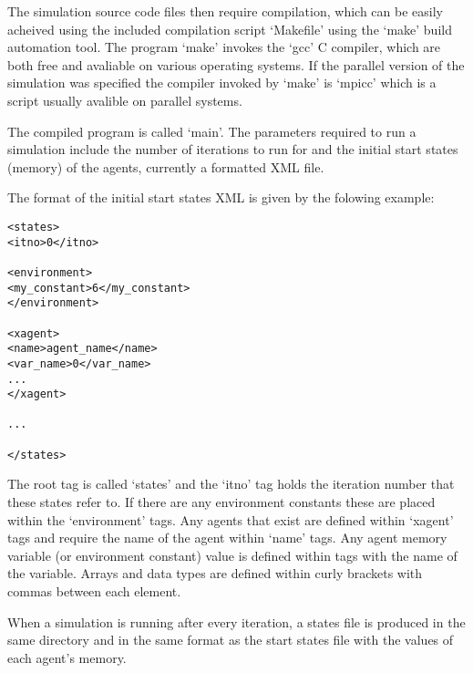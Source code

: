 The simulation source code files then require compilation, which can be easily
acheived using the included compilation script `Makefile' using the `make'
build automation tool. The program `make' invokes the `gcc' C compiler, which
are both free and avaliable on various operating systems. If the parallel
version of the simulation was specified the compiler invoked by `make' is
`mpicc' which is a script usually avalible on parallel systems.

The compiled program is called `main'. The parameters required to run a
simulation include the number of iterations to run for and the initial start
states (memory) of the agents, currently a formatted XML file.

The format of the initial start states XML is given by the folowing example:

\begin{mylisting}
\begin{verbatim}
<states>
<itno>0</itno>

<environment>
<my_constant>6</my_constant>
</environment>

<xagent>
<name>agent_name</name>
<var_name>0</var_name>
...
</xagent>

...

</states>
\end{verbatim}
\end{mylisting}

The root tag is called `states' and the `itno' tag holds the iteration number
that these states refer to. If there are any environment constants these are
placed within the `environment' tags. Any agents that exist are defined within
`xagent' tags and require the name of the agent within `name' tags. Any agent
memory variable (or environment constant) value is defined within tags with
the name of the variable. Arrays and data types are defined within curly
brackets with commas between each element.

When a simulation is running after every iteration, a states file is produced
in the same directory and in the same format as the start states file with the
values of each agent's memory.

